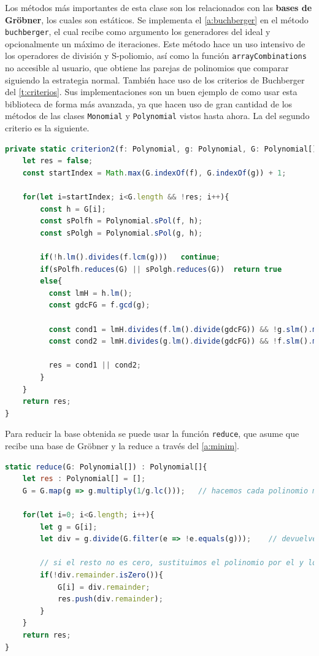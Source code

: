 Los métodos más importantes de esta clase son los relacionados con las \textbf{bases de Gröbner}, los cuales son estáticos. Se implementa el \autoref{a:buchberger} en el método \texttt{buchberger}, el cual recibe como argumento los generadores del ideal y opcionalmente un máximo de iteraciones. Este método hace un uso intensivo de los operadores de división y S-poliomio, así como la función \texttt{arrayCombinations} no accesible al usuario, que obtiene las parejas de polinomios que comparar siguiendo la estrategia normal. También hace uso de los criterios de Buchberger del \autoref{t:criterios}. Sus implementaciones son un buen ejemplo de como usar esta biblioteca de forma más avanzada, ya que hacen uso de gran cantidad de los métodos de las clases \texttt{Monomial} y \texttt{Polynomial} vistos hasta ahora. La del segundo criterio es la siguiente.
\begin{lstlisting}[language=Javascript]
private static criterion2(f: Polynomial, g: Polynomial, G: Polynomial[]) : boolean {
    let res = false;
    const startIndex = Math.max(G.indexOf(f), G.indexOf(g)) + 1;

    for(let i=startIndex; i<G.length && !res; i++){
        const h = G[i];
        const sPolfh = Polynomial.sPol(f, h);
        const sPolgh = Polynomial.sPol(g, h);
    
        if(!h.lm().divides(f.lcm(g)))   continue;
        if(sPolfh.reduces(G) || sPolgh.reduces(G))  return true
        else{
          const lmH = h.lm();
          const gdcFG = f.gcd(g);
    
          const cond1 = lmH.divides(f.lm().divide(gdcFG)) && !g.slm().multiply(h.lm()).equals(h.slm().multiply(g.lm()));
          const cond2 = lmH.divides(g.lm().divide(gdcFG)) && !f.slm().multiply(h.lm()).equals(h.slm().multiply(f.lm()));
    
          res = cond1 || cond2;
        }
    }
    return res;
}
\end{lstlisting}
Para reducir la base obtenida se puede usar la función \texttt{reduce}, que asume que recibe una base de Gröbner y la reduce a través del \autoref{a:minim}. 
\begin{lstlisting}[language=Javascript]
static reduce(G: Polynomial[]) : Polynomial[]{
    let res : Polynomial[] = [];
    G = G.map(g => g.multiply(1/g.lc()));   // hacemos cada polinomio mónico (lc=1)

    for(let i=0; i<G.length; i++){
        let g = G[i];
        let div = g.divide(G.filter(e => !e.equals(g)));    // devuelve el resto y los coeficientes

        // si el resto no es cero, sustituimos el polinomio por el y lo añadimos a la base resultado 
        if(!div.remainder.isZero()){
            G[i] = div.remainder;
            res.push(div.remainder);
        }
    }
    return res;
}
\end{lstlisting}

